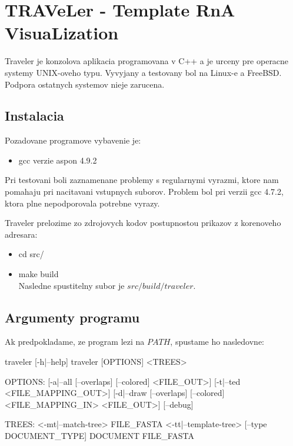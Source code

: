 \newcommand{\paramI}[1]{\text{-}\ensuremath{#1}}
\newcommand{\param}[1]{\text{\--\--}\ensuremath{#1}}

\chapter{TRAVeLer - Template RnA VisuaLization}

Traveler je konzolova aplikacia programovana v C++ a je urceny pre operacne systemy UNIX-oveho typu.
Vyvyjany a testovany bol na Linux-e a FreeBSD. Podpora ostatnych systemov nieje zarucena.

\section{Instalacia}

Pozadovane programove vybavenie je:
\begin{itemize}
  \item gcc verzie aspon 4.9.2
\end{itemize}

Pri testovani boli zaznamenane problemy s regularnymi vyrazmi, ktore nam pomahaju pri nacitavani
vstupnych suborov. Problem bol pri verzii gcc 4.7.2, ktora plne nepodporovala potrebne vyrazy.

Traveler prelozime zo zdrojovych kodov postupnostou prikazov z korenoveho adresara:
\begin{itemize}
  \item cd src/
  \item make build
    \\
    Nasledne spustitelny subor je $src/build/traveler$.
\end{itemize}

\section{Argumenty programu}

Ak predpokladame, ze program lezi na $PATH$, spustame ho nasledovne:

\begin{code}[frame=none]
traveler [-h|--help]
traveler [OPTIONS] <TREES>

OPTIONS:
  [-a|--all [--overlaps] [--colored] <FILE_OUT>]
  [-t|--ted <FILE_MAPPING_OUT>]
  [-d|--draw [--overlaps] [--colored] <FILE_MAPPING_IN> <FILE_OUT>]
  [--debug]

TREES:
  <-mt|--match-tree> FILE_FASTA
  <-tt|--template-tree> [--type DOCUMENT_TYPE] DOCUMENT FILE_FASTA
\end{code}

